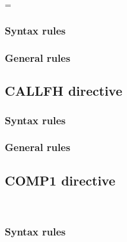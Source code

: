\begin{syntax}[\miscextcolour]
  \begin{1=}
     \\
  \end{1=}
  \literal = \literal
\end{syntax}

\subsubsection{Syntax rules}

\subsubsection{General rules}

\subsection{CALLFH directive}

\begin{syntax}[\miscextcolour]
  \begin{0-1}
    \literal
  \end{0-1}
\end{syntax}

\subsubsection{Syntax rules}

\subsubsection{General rules}

\subsection{COMP1 directive}

\begin{syntax}[\miscextcolour]
  \begin{1=}
     \\
  \end{1=}
\end{syntax}

\subsubsection{Syntax rules}

